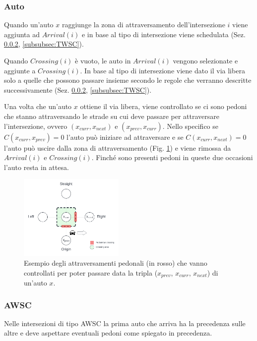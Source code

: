 \subsubsection{Auto}
Quando un'auto $x$ raggiunge la zona di attraversamento dell'intersezione $i$ viene aggiunta ad $\textit{Arrival}(i)$ e 
in base al tipo di intersezione viene schedulata (Sez. \ref{subsubsec:AWSC}, \ref{subsubsec:TWSC}).

Quando $\textit{Crossing}(i)$ è vuoto, le auto in $\textit{Arrival}(i)$ vengono selezionate e aggiunte a $\textit{Crossing}(i)$. In base al tipo di 
intersezione viene dato il via libera solo a quelle che possono passare insieme secondo le regole che verranno descritte successivamente (Sez. \ref{subsubsec:AWSC}, \ref{subsubsec:TWSC}).

%
Una volta che un'auto $x$ ottiene il via libera, viene controllato se ci sono pedoni che stanno attraversando le strade 
su cui deve passare per attraversare l'intersezione, ovvero $(x_{curr}, x_{next})$ e $(x_{prev}, x_{curr})$.
Nello specifico se $C(x_{curr},x_{prev}) = 0$ l'auto può iniziare ad attraversare e se $C(x_{curr},x_{next}) = 0$ 
l'auto può uscire dalla zona di attraversamento (Fig. \ref{fig:auto-ped-crossing}) e viene rimossa da $\textit{Arrival}(i)$ e $\textit{Crossing}(i)$. 
Finché sono presenti pedoni in queste due occasioni l'auto resta in attesa.

\begin{figure}[ht]
    \centering
    \includegraphics[width=0.45\textwidth]{images/crossing_auto_ped_crossing}
    \caption{Esempio degli attraversamenti pedonali (in rosso) che vanno controllati
        per poter passare data la tripla ($x_{prev}$, $x_{curr}$, $x_{next}$) di un'auto $x$.}
    \label{fig:auto-ped-crossing}
\end{figure}

\subsubsection{AWSC}
\label{subsubsec:AWSC}
Nelle intersezioni di tipo AWSC la prima auto che arriva ha la precedenza sulle altre e deve aspettare eventuali pedoni come spiegato in precedenza.

